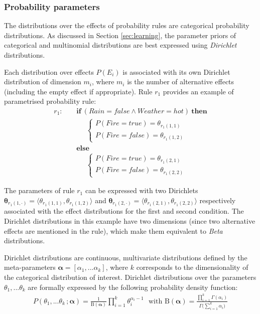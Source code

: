 \subsubsection*{Probability parameters}

The distributions over the effects of probability rules are categorical probability distributions.  As discussed in Section \ref{sec:learning}, the parameter priors of categorical and multinomial distributions are best expressed using \textit{Dirichlet} distributions. 

Each distribution over effects $P(E_i)$ is associated with its own Dirichlet distribution of dimension $m_i$, where $m_i$ is the number of alternative effects (including the empty effect if appropriate).  Rule $r_{1}$ provides an example of parametrised probability rule: 
\begin{align*}
r_{1}: \ \ \ \ \ & \textbf{if} \ (\mathit{Rain}\!=\!\mathit{false} \land \mathit{Weather}\!=\!\mathit{hot}) \ \textbf{then} \\
& \;\;\;\;\;  \begin{cases}
 P(\mathit{Fire}\!=\!\mathit{true}) = \theta_{r_{1}(1,1)} \\ 
P(\mathit{Fire}\!=\!\mathit{false}) = \theta_{r_{1}(1,2)}
\end{cases}  \\ 
& \textbf{else} \\
& \;\;\;\;\; \begin{cases}
P(\mathit{Fire}\!=\!\mathit{true}) = \theta_{r_{1}(2,1)} \\
P(\mathit{Fire}\!=\!\mathit{false}) = \theta_{r_{1}(2,2)}
\end{cases} 
\end{align*}


The parameters of rule $r_{1}$ can be expressed with two Dirichlets $\boldsymbol\theta_{r_{1}(1,\cdot)} = \langle \theta_{r_{1}(1,1)},\theta_{r_{1}(1,2)} \rangle$ and $\boldsymbol\theta_{r_{1}(2,\cdot)} = \langle \theta_{r_{1}(2,1)}, \theta_{r_{1}(2,2)} \rangle$ respectively associated with the effect distributions for the first and second condition.  The Dirichlet distributions in this example have two dimensions (since two alternative effects are mentioned in the rule), which make them equivalent to \textit{Beta} distributions. 

Dirichlet distributions are continuous, multivariate distributions defined by the meta-parameters $\boldsymbol\alpha = [\alpha_1,... \alpha_k]$, where $k$ corresponds to the dimensionality of the categorical distribution of interest.  Dirichlet distributions over the parameters $\theta_1,... \theta_k$ are formally expressed by the following probability density function:
\begin{align}
P(\theta_1,...\theta_k\,; \boldsymbol\alpha) = \frac{1}{\mathrm{B}(\boldsymbol\alpha)} \prod_{i=1}^k \theta_i^{\alpha_i - 1} \ \ \ \text{with } \mathrm{B}(\boldsymbol\alpha) = \frac{\prod_{i=1}^k \Gamma(\alpha_i)}{\Gamma\bigl(\sum_{i=1}^k \alpha_i\bigr)}
\end{align}

